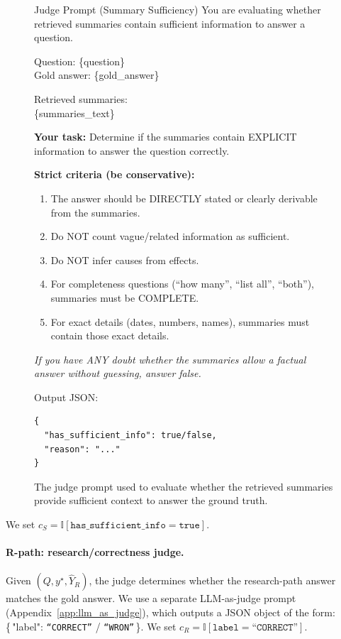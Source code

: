 \documentclass{article}
\theoremstyle{plain}
\theoremstyle{definition}
\theoremstyle{remark}
\begin{document}
\begin{figure}[htb]
\begin{AIbox}[width=\columnwidth]{Judge Prompt (Summary Sufficiency)}
\footnotesize
You are evaluating whether retrieved summaries contain sufficient information to answer a question.

Question: \{question\} \\
Gold answer: \{gold\_answer\}

Retrieved summaries: \\
\{summaries\_text\}

\textbf{Your task:} Determine if the summaries contain EXPLICIT information to answer the question correctly.

\textbf{Strict criteria (be conservative):}
\begin{enumerate}
    \item The answer should be DIRECTLY stated or clearly derivable from the summaries.
    \item Do NOT count vague/related information as sufficient.
    \item Do NOT infer causes from effects.
    \item For completeness questions (``how many'', ``list all'', ``both''), summaries must be COMPLETE.
    \item For exact details (dates, numbers, names), summaries must contain those exact details.
\end{enumerate}

\textit{If you have ANY doubt whether the summaries allow a factual answer without guessing, answer false.}

Output JSON:
\begin{verbatim}
{
  "has_sufficient_info": true/false, 
  "reason": "..."
}
\end{verbatim}
\end{AIbox}
\caption{The judge prompt used to evaluate whether the retrieved summaries provide sufficient context to answer the ground truth.}
\label{fig:judge_sufficiency_prompt}
\end{figure}

We set $c_S=\mathbb{I}[\texttt{has\_sufficient\_info}=\texttt{true}]$.

\paragraph{R-path: research/correctness judge.}
Given $(Q, y^\star, \hat{Y}_R)$, the judge determines whether the research-path answer matches the gold answer.
We use a separate LLM-as-judge prompt (Appendix~\ref{app:llm_as_judge}), which outputs a JSON object of the form:
\{\,"label": \texttt{``CORRECT''} / \texttt{``WRON''}\,\}.
We set $c_R=\mathbb{I}[\texttt{label}=\texttt{``CORRECT''}]$.
\end{document}
